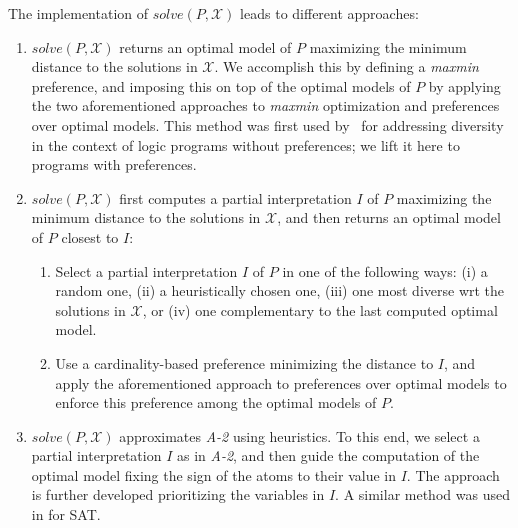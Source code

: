 The implementation of $\mathit{solve}(P,\mathcal{X})$ leads to different approaches:
%
\begin{enumerate}[label={\textcolor{darkgray}{\sffamily\bfseries\mathversion{bold}{A-\arabic*}}}.]
\item $\mathit{solve}(P,\mathcal{X})$ returns an optimal model of $P$ maximizing the minimum distance to the solutions in 
    $\mathcal{X}$.
%
  We accomplish this by defining a \textit{maxmin} preference, %
  and imposing this on top of the optimal models of $P$ 
  by applying the two aforementioned approaches to \emph{maxmin} optimization and preferences over optimal models.
  This method was first used by~\cite{eiererfi13a} for addressing diversity in the context of logic programs without preferences;
  we lift it here to programs with preferences.
  
\item $\mathit{solve}(P,\mathcal{X})$ first computes a partial interpretation $I$ of $P$ maximizing the minimum distance to the solutions in  $\mathcal{X}$, 
  and then returns an optimal model of $P$ closest to $I$:
  \begin{enumerate}
  \item Select a partial interpretation $I$ of $P$ in one of the following ways:
(i) %
    a random one,
(ii) %
    a heuristically chosen one, %
(iii) %
    one most diverse wrt the solutions in $\mathcal{X}$, or 
(iv) %
    one complementary to the last computed optimal model.%
  \item Use a cardinality-based preference minimizing the distance to $I$, and
    apply the aforementioned approach to preferences over optimal models to enforce this preference among the optimal models of $P$.
  \end{enumerate}
  
\item $\mathit{solve}(P,\mathcal{X})$ approximates \emph{A-2} using heuristics. %
  To this end, we select a partial interpretation $I$ as in \emph{A-2}, 
  and then guide the computation of the optimal model fixing the sign of the atoms to their value in $I$. 
  The approach is further developed prioritizing the variables in $I$.
  A similar method was used in \cite{nadel11a} for SAT.
\end{enumerate}


